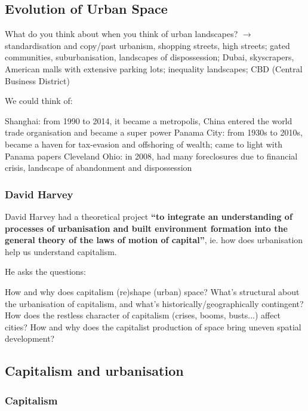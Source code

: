 \documentclass{article}
\begin{document}
\subsection{Evolution of Urban Space}

What do you think about when you think of urban landscapes? $\rightarrow$ standardisation and copy/past urbanism, shopping streets, high streets; gated communities, suburbanisation, landscapes of dispossession; Dubai, skyscrapers, American malls with extensive parking lots; inequality landscapes; CBD (Central Business District)

We could think of:

\begin{outline}
	\1 Shanghai: from 1990 to 2014, it became a metropolis, China entered the world trade organisation and became a super power
	\1 Panama City: from 1930s to 2010s, became a haven for tax-evasion and offshoring of wealth; came to light with Panama papers
	\1 Cleveland Ohio: in 2008, had many foreclosures due to financial crisis, landscape of abandonment and dispossession 
\end{outline}

\subsubsection{David Harvey}

David Harvey had a theoretical project \textbf{``to integrate an understanding of processes of urbanisation and built environment formation into the general theory of the laws of motion of capital''}, ie. how does urbanisation help us understand capitalism.

He asks the questions:

\begin{outline}
	\1 How and why does capitalism (re)shape (urban) space?
	\1 What's structural about the urbanisation of capitalism, and what's historically/geographically contingent?
	\1 How does the restless character of capitalism (crises, booms, busts...) affect cities?
	\1 How and why does the capitalist production of space bring uneven spatial development?
\end{outline}

\subsection{Capitalism and urbanisation}

\subsubsection{Capitalism}
\end{document}
